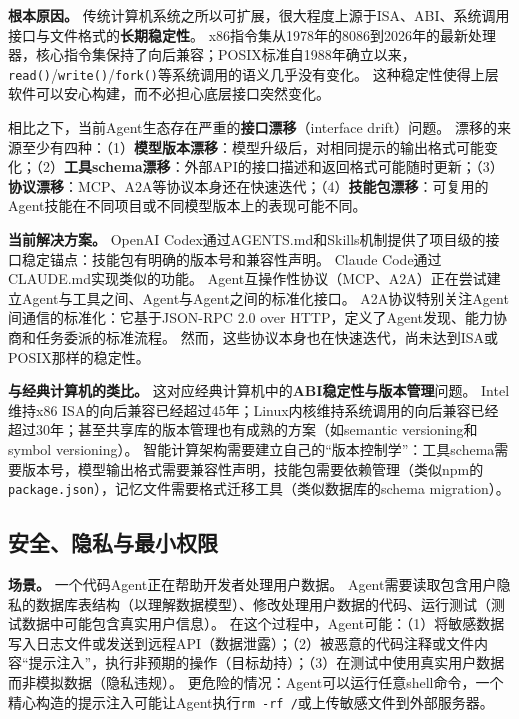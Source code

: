 \textbf{根本原因。}
传统计算机系统之所以可扩展，很大程度上源于ISA、ABI、系统调用接口与文件格式的\textbf{长期稳定性}。
x86指令集从1978年的8086到2026年的最新处理器，核心指令集保持了向后兼容；POSIX标准自1988年确立以来，\texttt{read()}/\texttt{write()}/\texttt{fork()}等系统调用的语义几乎没有变化\cite{ostep_2023}。
这种稳定性使得上层软件可以安心构建，而不必担心底层接口突然变化。

相比之下，当前Agent生态存在严重的\textbf{接口漂移}（interface drift）问题。
漂移的来源至少有四种：（1）\textbf{模型版本漂移}：模型升级后，对相同提示的输出格式可能变化；（2）\textbf{工具schema漂移}：外部API的接口描述和返回格式可能随时更新\cite{mcp_intro_2026}；（3）\textbf{协议漂移}：MCP、A2A等协议本身还在快速迭代\cite{agentprotocols2025,google_a2a_2025}；（4）\textbf{技能包漂移}：可复用的Agent技能在不同项目或不同模型版本上的表现可能不同。

\textbf{当前解决方案。}
OpenAI Codex通过AGENTS.md\cite{openai_codex_agents_md_2026}和Skills\cite{openai_codex_skills_2026}机制提供了项目级的接口稳定锚点：技能包有明确的版本号和兼容性声明。
Claude Code通过CLAUDE.md\cite{anthropic_claudecode_memory_2026}实现类似的功能。
Agent互操作性协议（MCP\cite{mcp_intro_2026}、A2A\cite{google_a2a_2025}）正在尝试建立Agent与工具之间、Agent与Agent之间的标准化接口。
A2A协议特别关注Agent间通信的标准化：它基于JSON-RPC 2.0 over HTTP，定义了Agent发现、能力协商和任务委派的标准流程\cite{google_a2a_2025}。
然而，这些协议本身也在快速迭代，尚未达到ISA或POSIX那样的稳定性。

\textbf{与经典计算机的类比。}
这对应经典计算机中的\textbf{ABI稳定性与版本管理}问题。
Intel维持x86 ISA的向后兼容已经超过45年；Linux内核维持系统调用的向后兼容已经超过30年；甚至共享库的版本管理也有成熟的方案（如semantic versioning和symbol versioning）。
智能计算架构需要建立自己的``版本控制学''：工具schema需要版本号，模型输出格式需要兼容性声明，技能包需要依赖管理（类似npm的\texttt{package.json}），记忆文件需要格式迁移工具（类似数据库的schema migration）。

\subsection{安全、隐私与最小权限}

\textbf{场景。}
一个代码Agent正在帮助开发者处理用户数据。
Agent需要读取包含用户隐私的数据库表结构（以理解数据模型）、修改处理用户数据的代码、运行测试（测试数据中可能包含真实用户信息）。
在这个过程中，Agent可能：（1）将敏感数据写入日志文件或发送到远程API（数据泄露）；（2）被恶意的代码注释或文件内容``提示注入''，执行非预期的操作（目标劫持）；（3）在测试中使用真实用户数据而非模拟数据（隐私违规）。
更危险的情况：Agent可以运行任意shell命令，一个精心构造的提示注入可能让Agent执行\texttt{rm -rf /}或上传敏感文件到外部服务器。

